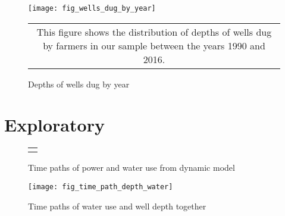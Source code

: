 \documentclass{article}
\numberwithin{table}{section}
\begin{document}
\renewcommand{\tabcolsep}{8pt}


\renewcommand{\tabcolsep}{10pt}


\renewcommand{\tabcolsep}{2pt}


\renewcommand{\tabcolsep}{8pt}




\clearpage

\begin{figure}[htbp]
	\centering\caption{Depths of wells dug by year\label{fig:wellsDugByYear}}
	\texttt{[image: fig\_wells\_dug\_by\_year]}
	\begin{tabular*}{1.0\hsize}{c}
		\multicolumn{1}{p{1.0\hsize}}{\footnotesize This figure shows the distribution of depths of wells dug by farmers in our sample between the years 1990 and 2016.}\\
	\end{tabular*}
\end{figure}





\clearpage

\section{Exploratory}

\begin{figure}[htbp]
	\centering
	\caption{Time paths of power and water use from dynamic model}
	\subfiguretopcaptrue
	\begin{tabular*}{1.0\textwidth}{c}
		\multicolumn{1}{p{1.0\hsize}}{\footnotesize }\\
	\end{tabular*}
\end{figure}

\begin{figure}
	\centering
	\caption{Time paths of water use and well depth together}
	\texttt{[image: fig\_time\_path\_depth\_water]}
\end{figure}
\end{document}
